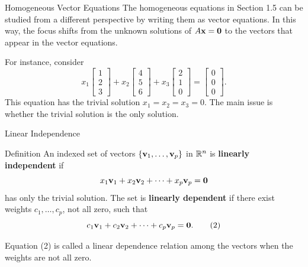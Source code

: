 \begin{frame}{Homogeneous Vector Equations}
The homogeneous equations in Section 1.5 can be studied from a different
perspective by writing them as vector equations. In this way, the focus
shifts from the unknown solutions of $A\mathbf{x}=\mathbf{0}$ to the vectors
that appear in the vector equations.\pause

\medskip
For instance, consider
\[
x_1\begin{bmatrix}1\\2\\3\end{bmatrix}
+x_2\begin{bmatrix}4\\5\\6\end{bmatrix}
+x_3\begin{bmatrix}2\\1\\0\end{bmatrix}
=\begin{bmatrix}0\\0\\0\end{bmatrix}. \tag{1}
\]\pause
This equation has the trivial solution $x_1=x_2=x_3=0$. The main issue is
whether the trivial solution is the only solution.
\end{frame}

\begin{frame}{Linear Independence}
\begin{block}{Definition}
An indexed set of vectors $\{\mathbf{v}_1,\ldots,\mathbf{v}_p\}$ in $\mathbb{R}^n$ is
\textbf{linearly independent} if
\[
x_1\mathbf{v}_1+x_2\mathbf{v}_2+\cdots+x_p\mathbf{v}_p=\mathbf{0}
\]
has only the trivial solution. The set is \textbf{linearly dependent} if
there exist weights $c_1,\ldots,c_p$, not all zero, such that
\[
c_1\mathbf{v}_1+c_2\mathbf{v}_2+\cdots+c_p\mathbf{v}_p=\mathbf{0}. \tag{2}
\]
\end{block}\pause
Equation (2) is called a \textcolor{lectureblue}{linear dependence relation}
among the vectors when the weights are not all zero.
\end{frame}

